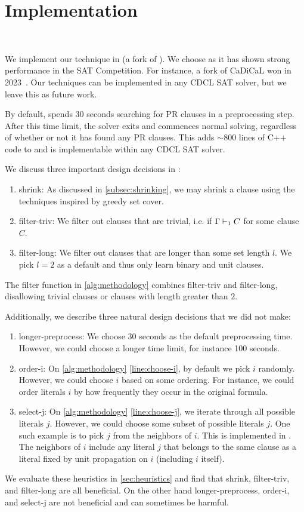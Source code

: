 \section{Implementation}~\label{sec:implementation}

We implement our technique in \tool (a fork of \cadical
). We choose \cadical as it has shown strong performance in the SAT Competition.
For instance, a fork of CaDiCaL won in 2023~\cite{satcomp2023}. Our techniques
can be implemented in any CDCL SAT solver, but we leave this as future work.

By default, \tool spends 30 seconds searching for PR clauses in a preprocessing step. After this time limit, the solver exits and commences normal solving,
regardless of whether or not it has found any PR clauses. This adds $\sim\!800$ lines
of C++ code to \cadical and is implementable within any CDCL SAT solver.

We discuss three important design decisions in \tool:

\begin{enumerate}
  \item \textsf{shrink}: As discussed in \autoref{subsec:shrinking}, we may
  shrink a clause using the techniques inspired by greedy set cover.
  \item \textsf{filter-triv}: We filter out clauses that are trivial, i.e. if
  $\Gamma \vdash_1 C$ for some clause $C$.
  \item \textsf{filter-long}: We filter out clauses that are longer than some
  set length $l$. We pick $l = 2$ as a default and thus only learn binary and unit
  clauses.
\end{enumerate}

The filter function in \autoref{alg:methodology} combines \textsf{filter-triv} and \textsf{filter-long},
disallowing trivial clauses or clauses with length greater than $2$.

Additionally, we describe three natural design decisions that we did not make:

\begin{enumerate}
  \item \textsf{longer-preprocess}: We choose 30 seconds as the default
  preprocessing time. However, we could choose a longer time limit, for instance
  100 seconds.
  \item \textsf{order-i}: On \autoref{alg:methodology} \autoref{line:choose-i},
  by default we pick $i$ randomly. However, we could choose $i$ based
  on some ordering. For instance, we could order literals $i$ by how frequently
  they occur in the original formula.
  \item \textsf{select-j}: On \autoref{alg:methodology} \autoref{line:choose-j},
  we iterate through all possible literals $j$. However, we
  could choose some subset of possible literals $j$. One such example is to pick $j$ from 
  the neighbors of $i$. This is implemented in \prelearn.
  The neighbors of $i$ include any literal $j$ that belongs to the same clause as
  a literal fixed by unit propagation on $i$ (including $i$ itself).
\end{enumerate}

We evaluate these heuristics in \autoref{sec:heuristics} and find that
\textsf{shrink}, \textsf{filter-triv}, and \textsf{filter-long} are all
beneficial. On the other hand \textsf{longer-preprocess}, \textsf{order-i}, and
\textsf{select-j} are not beneficial and can sometimes be harmful.
